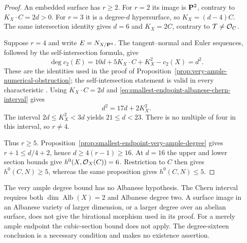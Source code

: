 \begin{proof}
An embedded surface has $r\ge2$.  For $r=2$ its image is $\mathbf P^2$,
contrary to $K_X\cdot C=2d>0$.
For $r=3$ it is a degree-$d$ hypersurface, so
$K_X=(d-4)C$.  The same intersection identity gives $d=6$
and $K_X=2C$, contrary to $\mathcal T\ne\mathcal O_C$.

Suppose $r=4$ and write $E=N_{X/\mathbf P^4}$.
The tangent--normal and Euler sequences, followed by the
self-intersection formula, give
\[
 \deg c_2(E)=10d+5K_X\cdot C+K_X^2-c_2(X)=d^2.
\]
These are the identities used in the proof of
Proposition~\ref{prop:very-ample-numerical-obstruction};
the self-intersection statement is valid in every characteristic
\cite[Tags~0FV9 and~0FEZ]{Stacks}.
Using $K_X\cdot C=2d$ and
\eqref{eq:smallest-endpoint-albanese-chern-interval} gives
\begin{equation}\label{eq:smallest-endpoint-p4-double-point}
 d^2=17d+2K_X^2.
\end{equation}
The interval $2d\le K_X^2<3d$ yields $21\le d<23$.
There is no multiple of four in this interval, so $r\ne4$.

Thus $r\ge5$.  Proposition~\ref{prop:smallest-endpoint-very-ample-degree}
gives $r+1\le d/4+2$, hence $d\ge4(r-1)\ge16$.
At $d=16$ the upper and lower section bounds give
$h^0(X,\mathcal O_X(C))=6$.
Restriction to $C$ then gives $h^0(C,N)\ge5$, whereas the same
proposition gives $h^0(C,N)\le5$.
\end{proof}

\begin{remark}
\label{rem:smallest-endpoint-numerical-scope}
The very ample degree bound has no Albanese hypothesis.
The Chern interval requires both $\dim\operatorname{Alb}(X)=2$
and Albanese degree two.  A surface image in an Albanese variety
of larger dimension, or a larger degree over an abelian surface,
does not give the birational morphism used in its proof.
For a merely ample endpoint the cubic-section bound does not apply.
The degree-sixteen conclusion is a necessary condition and makes
no existence assertion.
\end{remark}
